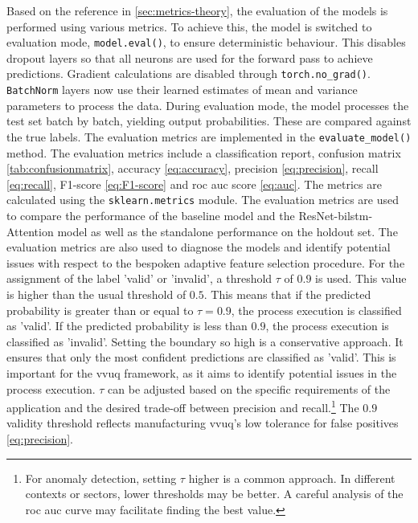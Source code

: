 Based on the reference in \autoref{sec:metrics-theory}, the evaluation of the models is performed using various metrics. To achieve this, the model is switched to evaluation mode, \texttt{model.eval()}, to ensure deterministic behaviour. This disables dropout layers so that all neurons are used for the forward pass to achieve predictions. Gradient calculations are disabled through \texttt{torch.no\_grad()}. \texttt{BatchNorm} layers now use their learned estimates of mean and variance parameters to process the data. During evaluation mode, the model processes the test set batch by batch, yielding output probabilities. These are compared against the true labels. The evaluation metrics are implemented in the \texttt{evaluate\_model()} method. The evaluation metrics include a classification report, confusion matrix \autoref{tab:confusionmatrix}, accuracy \autoref{eq:accuracy}, precision \autoref{eq:precision}, recall \autoref{eq:recall}, F1-score \autoref{eq:F1-score} and \gls{roc} \gls{auc} score \autoref{eq:auc}. The metrics are calculated using the \texttt{sklearn.metrics} module. The evaluation metrics are used to compare the performance of the baseline model and the ResNet-\gls{bilstm}-Attention model as well as the standalone performance on the holdout set. The evaluation metrics are also used to diagnose the models and identify potential issues with respect to the bespoken adaptive feature selection procedure. For the assignment of the label 'valid' or 'invalid', a threshold $\tau$ of $0.9$ is used. This value is higher than the usual threshold of $0.5$. This means that if the predicted probability is greater than or equal to $\tau = 0.9$, the process execution is classified as 'valid'. If the predicted probability is less than $0.9$, the process execution is classified as 'invalid'. Setting the boundary so high is a conservative approach. It ensures that only the most confident predictions are classified as 'valid'. This is important for the \gls{vvuq} framework, as it aims to identify potential issues in the process execution. $\tau$ can be adjusted based on the specific requirements of the application and the desired trade-off between precision and recall.\footnote{For anomaly detection, setting $\tau$ higher is a common approach. In different contexts or sectors, lower thresholds may be better. A careful analysis of the \gls{roc} \gls{auc} curve may facilitate finding the best value.} The $0.9$ validity threshold reflects manufacturing \gls{vvuq}'s low tolerance for false positives \autoref{eq:precision}.

